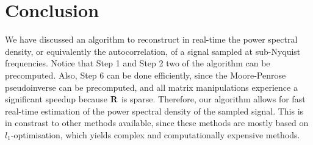 \documentclass[a4paper, openany, oneside]{memoir}
\begin{document}
\section{Conclusion}
We have discussed an algorithm to reconstruct in real-time the power spectral density, or equivalently the autocorrelation, of a signal sampled at sub-Nyquist frequencies. Notice that Step 1 and Step 2 two of the algorithm can be precomputed. Also, Step 6 can be done efficiently, since the Moore-Penrose pseudoinverse can be precomputed, and all matrix manipulations experience a significant speedup because $\boldsymbol{\mathbf{R}}$ is sparse. Therefore, our algorithm allows for fast real-time estimation of the power spectral density of the sampled signal. This is in constrast to other methods available, since these methods are mostly based on $l_1$-optimisation, which yields complex and computationally expensive methods.
\end{document}
